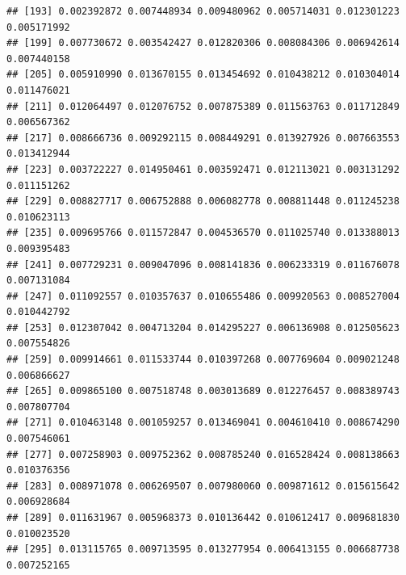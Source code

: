 \documentclass[
]{article}
\begin{document}
\begin{verbatim}
## [193] 0.002392872 0.007448934 0.009480962 0.005714031 0.012301223 0.005171992
## [199] 0.007730672 0.003542427 0.012820306 0.008084306 0.006942614 0.007440158
## [205] 0.005910990 0.013670155 0.013454692 0.010438212 0.010304014 0.011476021
## [211] 0.012064497 0.012076752 0.007875389 0.011563763 0.011712849 0.006567362
## [217] 0.008666736 0.009292115 0.008449291 0.013927926 0.007663553 0.013412944
## [223] 0.003722227 0.014950461 0.003592471 0.012113021 0.003131292 0.011151262
## [229] 0.008827717 0.006752888 0.006082778 0.008811448 0.011245238 0.010623113
## [235] 0.009695766 0.011572847 0.004536570 0.011025740 0.013388013 0.009395483
## [241] 0.007729231 0.009047096 0.008141836 0.006233319 0.011676078 0.007131084
## [247] 0.011092557 0.010357637 0.010655486 0.009920563 0.008527004 0.010442792
## [253] 0.012307042 0.004713204 0.014295227 0.006136908 0.012505623 0.007554826
## [259] 0.009914661 0.011533744 0.010397268 0.007769604 0.009021248 0.006866627
## [265] 0.009865100 0.007518748 0.003013689 0.012276457 0.008389743 0.007807704
## [271] 0.010463148 0.001059257 0.013469041 0.004610410 0.008674290 0.007546061
## [277] 0.007258903 0.009752362 0.008785240 0.016528424 0.008138663 0.010376356
## [283] 0.008971078 0.006269507 0.007980060 0.009871612 0.015615642 0.006928684
## [289] 0.011631967 0.005968373 0.010136442 0.010612417 0.009681830 0.010023520
## [295] 0.013115765 0.009713595 0.013277954 0.006413155 0.006687738 0.007252165
\end{verbatim}
\end{document}
